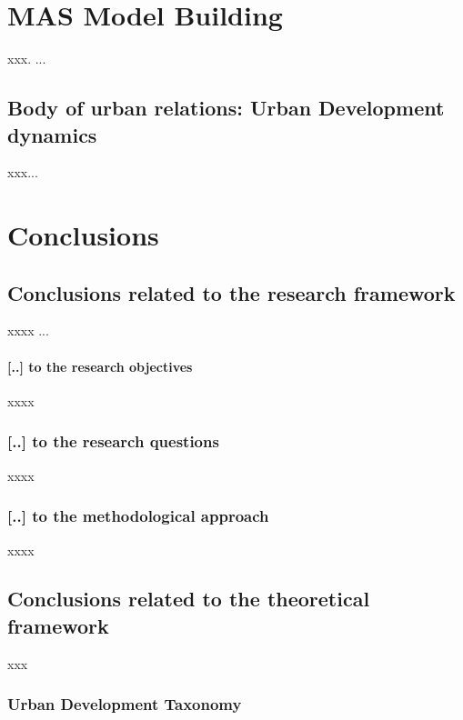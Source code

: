 \documentclass[11pt]{report}
\begin{document}
\chapter{MAS Model Building}


xxx. ...

\section{Body of urban relations: Urban Development dynamics}

xxx...


\chapter{Conclusions}


\section{Conclusions related to the research framework}

xxxx ...

\subsubsection{[..] to the research objectives}

xxxx

\subsection{[..] to the research questions}

xxxx

\subsection{[..] to the methodological approach}

xxxx

\section{Conclusions related to the theoretical framework}

xxx

\subsection{Urban Development Taxonomy}
\end{document}
